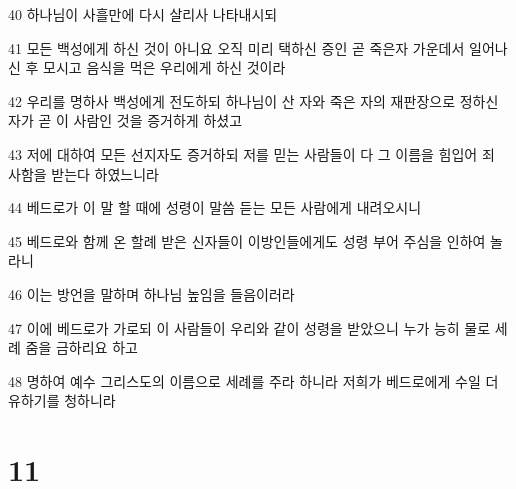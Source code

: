 \par 40 하나님이 사흘만에 다시 살리사 나타내시되
\par 41 모든 백성에게 하신 것이 아니요 오직 미리 택하신 증인 곧 죽은자 가운데서 일어나신 후 모시고 음식을 먹은 우리에게 하신 것이라
\par 42 우리를 명하사 백성에게 전도하되 하나님이 산 자와 죽은 자의 재판장으로 정하신 자가 곧 이 사람인 것을 증거하게 하셨고
\par 43 저에 대하여 모든 선지자도 증거하되 저를 믿는 사람들이 다 그 이름을 힘입어 죄 사함을 받는다 하였느니라
\par 44 베드로가 이 말 할 때에 성령이 말씀 듣는 모든 사람에게 내려오시니
\par 45 베드로와 함께 온 할례 받은 신자들이 이방인들에게도 성령 부어 주심을 인하여 놀라니
\par 46 이는 방언을 말하며 하나님 높임을 들음이러라
\par 47 이에 베드로가 가로되 이 사람들이 우리와 같이 성령을 받았으니 누가 능히 물로 세례 줌을 금하리요 하고
\par 48 명하여 예수 그리스도의 이름으로 세례를 주라 하니라 저희가 베드로에게 수일 더 유하기를 청하니라

\chapter{11}

